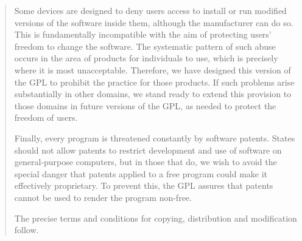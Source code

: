 \documentclass[letterpaper,10pt,english]{sphinxmanual}
\begin{document}
\begin{quote}
Some devices are designed to deny users access to install or run
modified versions of the software inside them, although the manufacturer
can do so.  This is fundamentally incompatible with the aim of
protecting users' freedom to change the software.  The systematic
pattern of such abuse occurs in the area of products for individuals to
use, which is precisely where it is most unacceptable.  Therefore, we
have designed this version of the GPL to prohibit the practice for those
products.  If such problems arise substantially in other domains, we
stand ready to extend this provision to those domains in future versions
of the GPL, as needed to protect the freedom of users.

Finally, every program is threatened constantly by software patents.
States should not allow patents to restrict development and use of
software on general-purpose computers, but in those that do, we wish to
avoid the special danger that patents applied to a free program could
make it effectively proprietary.  To prevent this, the GPL assures that
patents cannot be used to render the program non-free.

The precise terms and conditions for copying, distribution and
modification follow.
\end{quote}
\end{document}
